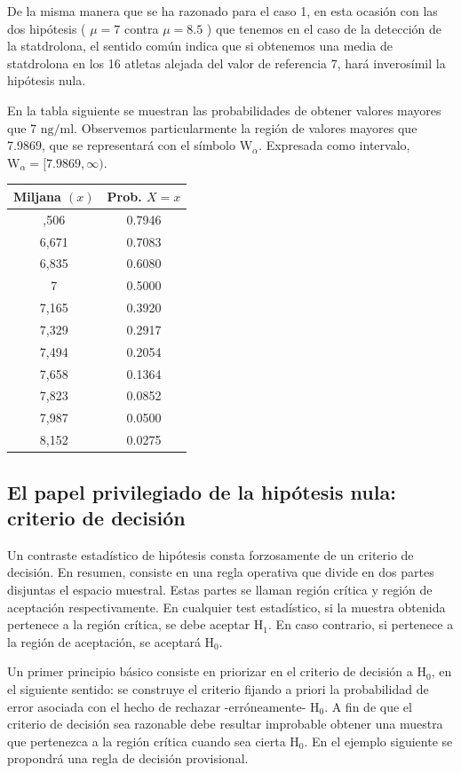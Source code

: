 \documentclass[
]{article}
\begin{document}
De la misma manera que se ha razonado para el caso 1, en esta ocasión con las dos hipótesis ( \(\mu=7\) contra \(\mu=8.5\) ) que tenemos en el caso de la detección de la statdrolona, el sentido común indica que si obtenemos una media de statdrolona en los 16 atletas alejada del valor de referencia 7, hará inverosímil la hipótesis nula.

En la tabla siguiente se muestran las probabilidades de obtener valores mayores que 7 \(\mathrm{ng} / \mathrm{ml}\). Observemos particularmente la región de valores mayores que 7.9869, que se representará con el símbolo \(\mathrm{W}_{\alpha}\). Expresada como intervalo, \(\mathrm{W}_{\alpha}=[7.9869, \infty)\).

\begin{longtable}[]{@{}cc@{}}
\toprule\noalign{}
Miljana \((x)\) & Prob. \(X=x\) \\
\midrule\noalign{}
\endhead
\bottomrule\noalign{}
\endlastfoot
6,506 & 0.7946 \\
6,671 & 0.7083 \\
6,835 & 0.6080 \\
7 & 0.5000 \\
7,165 & 0.3920 \\
7,329 & 0.2917 \\
7,494 & 0.2054 \\
7,658 & 0.1364 \\
7,823 & 0.0852 \\
7,987 & 0.0500 \\
8,152 & 0.0275 \\
\end{longtable}

\subsection{El papel privilegiado de la hipótesis nula: criterio de decisión}\label{el-papel-privilegiado-de-la-hipuxf3tesis-nula-criterio-de-decisiuxf3n}

Un contraste estadístico de hipótesis consta forzosamente de un criterio de decisión. En resumen, consiste en una regla operativa que divide en dos partes disjuntas el espacio muestral. Estas partes se llaman región crítica y región de aceptación respectivamente. En cualquier test estadístico, si la muestra obtenida pertenece a la región crítica, se debe aceptar \(\mathrm{H}_{1}\). En caso contrario, si pertenece a la región de aceptación, se aceptará \(\mathrm{H}_{0}\).

Un primer principio básico consiste en priorizar en el criterio de decisión a \(\mathrm{H}_{0}\), en el siguiente sentido: se construye el criterio fijando a priori la probabilidad de error asociada con el hecho de rechazar -erróneamente- \(\mathrm{H}_{0}\). A fin de que el criterio de decisión sea razonable debe resultar improbable obtener una muestra que pertenezca a la región crítica cuando sea cierta \(\mathrm{H}_{0}\). En el ejemplo siguiente se propondrá una regla de decisión provisional.
\end{document}

